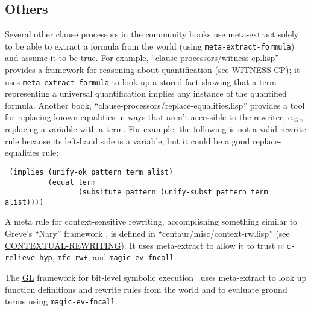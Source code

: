 \subsection{Others}

Several other clause processors in the community books use
meta-extract solely to be able to extract a formula from the world
(using \texttt{meta-extract-formula}) and assume it to be true.  For
example, ``clause-processors/witness-cp.lisp'' provides a framework
for reasoning about quantification (see
\href{http://www.cs.utexas.edu/users/moore/acl2/manuals/current/manual/index.html?topic=ACL2\_\_\_\_WITNESS-CP}{\underline{WITNESS-CP}}); it uses
\texttt{meta-extract-formula} to look up a stored fact showing that a
term representing a universal quantification implies any instance
of the quantified formula.  Another book,
``clause-processors/replace-equalities.lisp'' provides a tool for
replacing known equalities in ways that aren't accessible to the
rewriter, e.g., replacing a variable with a term.  For example, the
following is not a valid rewrite rule because its left-hand side is a variable,
but it could be a good replace-equalities rule:
\begin{verbatim}
 (implies (unify-ok pattern term alist)
          (equal term
                 (subsitute pattern (unify-subst pattern term alist))))
\end{verbatim}

A meta rule for context-sensitive rewriting, accomplishing something
similar to Greve's ``Nary'' framework \cite{greve06}, is defined in
``centaur/misc/context-rw.lisp'' (see
\href{http://www.cs.utexas.edu/users/moore/acl2/manuals/current/manual/index.html?topic=ACL2\_\_\_\_CONTEXTUAL-REWRITING}{\underline{CONTEXTUAL-REWRITING}}).
It uses meta-extract to allow it to
trust \texttt{mfc-relieve-hyp}, \texttt{mfc-rw+}, and
\href{http://www.cs.utexas.edu/users/moore/acl2/manuals/current/manual/index.html?topic=ACL2\_\_\_\_MAGIC-EV-FNCALL}{\underline{\tt magic-ev-fncall}}.

The
\href{http://www.cs.utexas.edu/users/moore/acl2/manuals/current/manual/index.html?topic=ACL2\_\_\_\_GL}{\underline{GL}}
framework for bit-level symbolic execution~\cite{gl-diss,
  bit-blasting-GL} uses meta-extract to look up function definitions
and rewrite rules from the world and to evaluate ground terms using
\texttt{magic-ev-fncall}.
